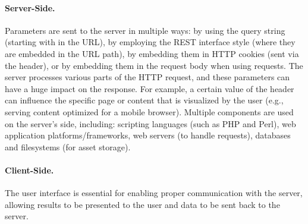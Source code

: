 \paragraph{Server-Side.} Parameters are sent to the server in multiple ways: by using the query string (starting with  in the URL), by employing the REST interface style (where they are embedded in the URL path), by embedding them in HTTP cookies (sent via the  header), or by embedding them in the request body when using  requests. The server processes various parts of the HTTP request, and these parameters can have a huge impact on the response. For example, a certain value of the  header can influence the specific page or content that is visualized by the user (e.g., serving content optimized for a mobile browser). Multiple components are used on the server's side, including: scripting languages (such as PHP and Perl), web application platforms/frameworks, web servers (to handle requests), databases and filesystems (for asset storage).

\paragraph{Client-Side.} The user interface is essential for enabling proper communication with the server, allowing results to be presented to the user and data to be sent back to the server.

